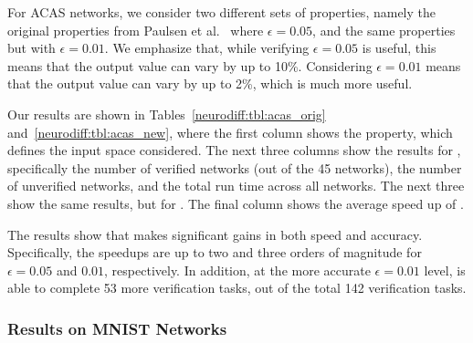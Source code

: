 For ACAS networks, we consider two different sets of properties,
namely the original properties from Paulsen et al.~\cite{paulsen2020reludiff}
where $ \epsilon = 0.05 $, and the same properties but with $ \epsilon
= 0.01 $.  We emphasize that, while verifying $ \epsilon = 0.05 $ is
useful, this means that the output value can vary by up to
10\%. Considering $ \epsilon = 0.01 $ means that the output value can
vary by up to 2\%, which is much more useful.

Our results are shown in Tables~\ref{neurodiff:tbl:acas_orig}
and~\ref{neurodiff:tbl:acas_new}, where the first column shows the property,
which defines the input space considered. The next three columns show
the results for \Name{}, specifically the number of verified networks
(out of the 45 networks), the number of unverified networks, and the
total run time across all networks. The next three show the same
results, but for \ReluDiffP{}. The final column shows the average
speed up of \Name{}.

The results show that \Name{} makes significant gains in both speed
and accuracy. Specifically, the speedups are up to two and three
orders of magnitude for $ \epsilon = 0.05 $ and $ 0.01 $,
respectively. In addition, at the more accurate $ \epsilon = 0.01 $
level, \Name{} is able to complete 53 more verification tasks, out of
the total 142 verification tasks.


\subsubsection{Results on MNIST Networks}

